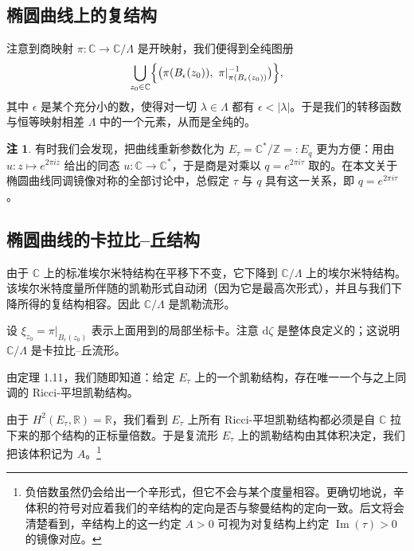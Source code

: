 \documentclass[11pt,a4paper]{article}
\theoremstyle{plain}
\theoremstyle{definition}
\newtheorem{remark}[theorem]{注}
\begin{document}
\subsection{椭圆曲线上的复结构}

注意到商映射 $\pi\colon\mathbb{C}\to\mathbb{C}/\Lambda$ 是开映射，我们便得到全纯图册
\[
\bigcup_{z_0\in\mathbb{C}}\Bigl\{\bigl(\pi(B_\epsilon(z_0)),\ \pi|_{\pi(B_\epsilon(z_0))}^{-1}\bigr)\Bigr\},
\]
其中 $\epsilon$ 是某个充分小的数，使得对一切 $\lambda\in\Lambda$ 都有 $\epsilon<|\lambda|$。于是我们的转移函数与恒等映射相差 $\Lambda$ 中的一个元素，从而是全纯的。
\begin{remark}
有时我们会发现，把曲线重新参数化为 $E_\tau=\mathbb{C}^*/\mathbb{Z}=:E_q$ 更为方便：用由 $u\colon z\mapsto e^{2\pi iz}$ 给出的同态 $u\colon\mathbb{C}\to\mathbb{C}^*$，于是商是对乘以 $q=e^{2\pi i\tau}$ 取的。在本文关于椭圆曲线同调镜像对称的全部讨论中，总假定 $\tau$ 与 $q$ 具有这一关系，即 $q=e^{2\pi i\tau}$。
\end{remark}

\subsection{椭圆曲线的卡拉比–丘结构}

由于 $\mathbb{C}$ 上的标准埃尔米特结构在平移下不变，它下降到 $\mathbb{C}/\Lambda$ 上的埃尔米特结构。该埃尔米特度量所伴随的凯勒形式自动闭（因为它是最高次形式），并且与我们下降所得的复结构相容。因此 $\mathbb{C}/\Lambda$ 是凯勒流形。

设 $\xi_{z_0}=\pi|_{B_\epsilon(z_0)}$ 表示上面用到的局部坐标卡。注意 $\mathrm{d}\zeta$ 是整体良定义的；这说明 $\mathbb{C}/\Lambda$ 是卡拉比–丘流形。

由定理 1.11，我们随即知道：给定 $E_\tau$ 上的一个凯勒结构，存在唯一一个与之上同调的 Ricci-平坦凯勒结构。

由于 $H^2(E_\tau,\mathbb{R})=\mathbb{R}$，我们看到 $E_\tau$ 上所有 Ricci-平坦凯勒结构都必须是自 $\mathbb{C}$ 拉下来的那个结构的正标量倍数。于是复流形 $E_\tau$ 上的凯勒结构由其体积决定，我们把该体积记为 $A$。\footnote{负倍数虽然仍会给出一个辛形式，但它不会与某个度量相容。更确切地说，辛体积的符号对应着我们的辛结构的定向是否与黎曼结构的定向一致。后文将会清楚看到，辛结构上的这一约定 $A>0$ 可视为对复结构上约定 $\operatorname{Im}(\tau)>0$ 的镜像对应。}
\end{document}
